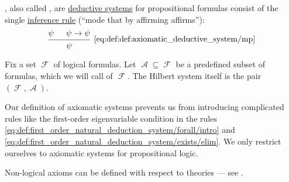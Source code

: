 \begin{definition}\label{def:axiomatic_deductive_system}
  , also called , are \hyperref[def:deductive_system]{deductive systems} for propositional formulas consist of the single \hyperref[def:judgment/inference_rule]{inference rule}  (\enquote{mode that by affirming affirms}):
  \begin{equation*}\taglabel[\logic{MP}]{eq:def:def:axiomatic_deductive_system/mp}
    \begin{prooftree}
      \hypo{ \psi }
      \hypo{ \psi \rightarrow \psi }
      \infer2[\ref{eq:def:def:axiomatic_deductive_system/mp}]{ \psi }
    \end{prooftree}
  \end{equation*}

  Fix a set \( \mscrF \) of logical formulas. Let \( \mscrA \subseteq \mscrF \) be a predefined subset of formulas, which we will call  of \( \mscrF \). The Hilbert system itself is the pair \( (\mscrF, \mscrA) \).
\end{definition}
\begin{comments}
  \item Our definition of axiomatic systems prevents us from introducing complicated rules like the first-order eigenvariable condition in the rules \eqref{eq:def:first_order_natural_deduction_system/forall/intro} and \eqref{eq:def:first_order_natural_deduction_system/exists/elim}. We only restrict ourselves to axiomatic systems for propositional logic.

  \item Non-logical axioms can be defined with respect to theories --- see .
\end{comments}

